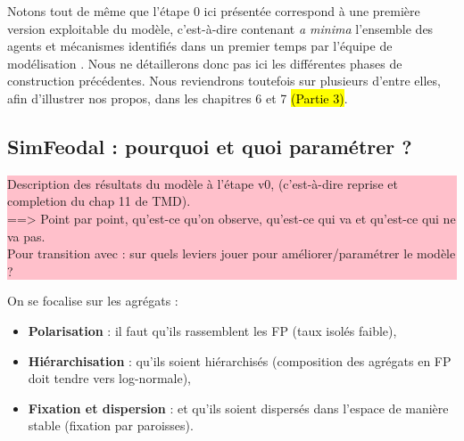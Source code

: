 \documentclass[12pt, a4paper, oneside]{book}
\begin{document}
	Notons tout de même que l'étape 0 ici présentée correspond à une première version \og exploitable\fg{} du modèle, c'est-à-dire contenant \textit{a minima} l'ensemble des agents et mécanismes identifiés dans un premier temps par l'équipe de modélisation \autocite{tannier_ontologie_2014}. Nous ne détaillerons donc pas ici les différentes phases de construction précédentes. Nous reviendrons toutefois sur plusieurs d'entre elles, afin d'illustrer nos propos, dans les chapitres 6 et 7 \hl{(Partie 3)}.
	
	\subsection{SimFeodal : pourquoi et quoi paramétrer ?}
	
			\colorbox{pink}{\parbox{0.9\textwidth}{%
			\vskip5pt
			Description des \og résultats\fg{} du modèle à l'étape v0, (c'est-à-dire reprise et completion du chap 11 de TMD).\\
			==> Point par point, qu'est-ce qu'on observe, qu'est-ce qui va et qu'est-ce qui ne va pas.\\
			Pour transition avec : sur quels leviers jouer pour améliorer/paramétrer le modèle ?
			
			\vskip5pt
		}
	}

	On se focalise sur les agrégats :
	\begin{itemize}
		\item \textbf{Polarisation} : il faut qu'ils rassemblent les FP (taux isolés faible),
		\item \textbf{Hiérarchisation} : qu'ils soient hiérarchisés (composition des agrégats en FP doit tendre vers log-normale),
		\item \textbf{Fixation et dispersion} : et qu'ils soient dispersés dans l'espace de manière stable (fixation par paroisses).
	\end{itemize}
\end{document}
